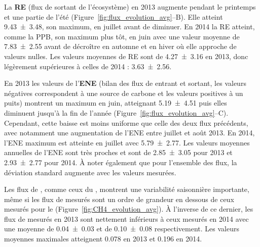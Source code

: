 La \textbf{RE} (flux de \coo sortant de l'écosystème) en 2013 augmente pendant le printemps et une partie de l'été (Figure~\ref{fig:flux_evolution_avg}--B).
Elle atteint \SI{9.43(348)}{\uml}, son maximum, en juillet avant de diminuer.
En 2014 la RE atteint, comme la PPB, son maximum plus tôt, en juin avec une valeur moyenne de \SI{7.83(255)}{\uml} avant de décroître en automne et en hiver où elle approche de valeurs nulles.
Les valeurs moyennes de RE sont de \SI{4.27(316)}{\uml} en 2013, donc légèrement supérieures à celles de 2014 : \SI{3.63(256)}{\uml}.

En 2013 les valeurs de l'\textbf{ENE} (bilan des flux de \coo entrant et sortant, les valeurs négatives correspondent à une source de carbone et les valeurs positives à un puits) montrent un maximum en juin, atteignant \SI{5.19(451)}{\uml} puis elles diminuent jusqu'à la fin de l'année  (Figure~\ref{fig:flux_evolution_avg}--C).
Cependant, cette baisse est moins uniforme que celle des deux flux précédents, avec notamment une augmentation de l'ENE entre juillet et août 2013.
En 2014, l'ENE maximum est atteinte en juillet avec \SI{5.79(277)}{\uml}.
Les valeurs moyennes annuelles de l'ENE sont très proches et sont de \SI{2.85(305)}{\uml} pour 2013 et \SI{2.93(277)}{\uml} pour 2014.
À noter également que pour l'ensemble des flux, la déviation standard augmente avec les valeurs mesurées.


Les flux de \textbf{\chh}, comme ceux du \coo, montrent une variabilité saisonnière importante, même si les flux de \chh mesurés sont un ordre de grandeur en dessous de ceux mesurés pour le \coo (Figure~\ref{fig:CH4_evolution_avg}).
À l'inverse de ce dernier, les flux de \chh mesurés en 2013 sont nettement inférieurs à ceux mesurés en 2014 avec une moyenne de \num{0.04(003)} et de \SI{0.10(008)}{\uml} respectivement.
Les valeurs moyennes maximales atteignent \num{0.078} en 2013 et \SI{0.196}{\uml} en 2014.

